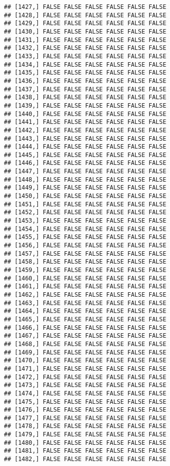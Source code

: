 \documentclass[
]{article}
\begin{document}
\begin{verbatim}
## [1427,] FALSE FALSE FALSE FALSE FALSE FALSE
## [1428,] FALSE FALSE FALSE FALSE FALSE FALSE
## [1429,] FALSE FALSE FALSE FALSE FALSE FALSE
## [1430,] FALSE FALSE FALSE FALSE FALSE FALSE
## [1431,] FALSE FALSE FALSE FALSE FALSE FALSE
## [1432,] FALSE FALSE FALSE FALSE FALSE FALSE
## [1433,] FALSE FALSE FALSE FALSE FALSE FALSE
## [1434,] FALSE FALSE FALSE FALSE FALSE FALSE
## [1435,] FALSE FALSE FALSE FALSE FALSE FALSE
## [1436,] FALSE FALSE FALSE FALSE FALSE FALSE
## [1437,] FALSE FALSE FALSE FALSE FALSE FALSE
## [1438,] FALSE FALSE FALSE FALSE FALSE FALSE
## [1439,] FALSE FALSE FALSE FALSE FALSE FALSE
## [1440,] FALSE FALSE FALSE FALSE FALSE FALSE
## [1441,] FALSE FALSE FALSE FALSE FALSE FALSE
## [1442,] FALSE FALSE FALSE FALSE FALSE FALSE
## [1443,] FALSE FALSE FALSE FALSE FALSE FALSE
## [1444,] FALSE FALSE FALSE FALSE FALSE FALSE
## [1445,] FALSE FALSE FALSE FALSE FALSE FALSE
## [1446,] FALSE FALSE FALSE FALSE FALSE FALSE
## [1447,] FALSE FALSE FALSE FALSE FALSE FALSE
## [1448,] FALSE FALSE FALSE FALSE FALSE FALSE
## [1449,] FALSE FALSE FALSE FALSE FALSE FALSE
## [1450,] FALSE FALSE FALSE FALSE FALSE FALSE
## [1451,] FALSE FALSE FALSE FALSE FALSE FALSE
## [1452,] FALSE FALSE FALSE FALSE FALSE FALSE
## [1453,] FALSE FALSE FALSE FALSE FALSE FALSE
## [1454,] FALSE FALSE FALSE FALSE FALSE FALSE
## [1455,] FALSE FALSE FALSE FALSE FALSE FALSE
## [1456,] FALSE FALSE FALSE FALSE FALSE FALSE
## [1457,] FALSE FALSE FALSE FALSE FALSE FALSE
## [1458,] FALSE FALSE FALSE FALSE FALSE FALSE
## [1459,] FALSE FALSE FALSE FALSE FALSE FALSE
## [1460,] FALSE FALSE FALSE FALSE FALSE FALSE
## [1461,] FALSE FALSE FALSE FALSE FALSE FALSE
## [1462,] FALSE FALSE FALSE FALSE FALSE FALSE
## [1463,] FALSE FALSE FALSE FALSE FALSE FALSE
## [1464,] FALSE FALSE FALSE FALSE FALSE FALSE
## [1465,] FALSE FALSE FALSE FALSE FALSE FALSE
## [1466,] FALSE FALSE FALSE FALSE FALSE FALSE
## [1467,] FALSE FALSE FALSE FALSE FALSE FALSE
## [1468,] FALSE FALSE FALSE FALSE FALSE FALSE
## [1469,] FALSE FALSE FALSE FALSE FALSE FALSE
## [1470,] FALSE FALSE FALSE FALSE FALSE FALSE
## [1471,] FALSE FALSE FALSE FALSE FALSE FALSE
## [1472,] FALSE FALSE FALSE FALSE FALSE FALSE
## [1473,] FALSE FALSE FALSE FALSE FALSE FALSE
## [1474,] FALSE FALSE FALSE FALSE FALSE FALSE
## [1475,] FALSE FALSE FALSE FALSE FALSE FALSE
## [1476,] FALSE FALSE FALSE FALSE FALSE FALSE
## [1477,] FALSE FALSE FALSE FALSE FALSE FALSE
## [1478,] FALSE FALSE FALSE FALSE FALSE FALSE
## [1479,] FALSE FALSE FALSE FALSE FALSE FALSE
## [1480,] FALSE FALSE FALSE FALSE FALSE FALSE
## [1481,] FALSE FALSE FALSE FALSE FALSE FALSE
## [1482,] FALSE FALSE FALSE FALSE FALSE FALSE

\end{verbatim}
\end{document}
